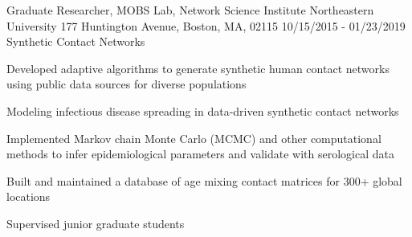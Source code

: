 \begin{cventries}
  \cventry
    {Graduate Researcher, MOBS Lab, Network Science Institute} %
    {Northeastern University} %
    {177 Huntington Avenue, Boston, MA, 02115} %
    {10/15/2015 - 01/23/2019} %
    {Synthetic Contact Networks} %
    {
      \begin{cvitems} %
        \item {Developed adaptive algorithms to generate synthetic human contact networks using public data sources for diverse populations}
        \item {Modeling infectious disease spreading in data-driven synthetic contact networks}
        \item {Implemented Markov chain Monte Carlo (MCMC) and other computational methods to infer epidemiological parameters and validate with serological data}
        \item {Built and maintained a database of 
        age mixing contact matrices
        for 300+ global locations}
        \item {Supervised junior graduate students}

\end{cvitems}}
\end{cventries}
